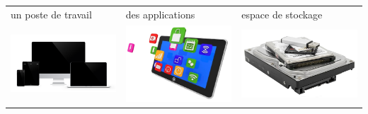 \documentclass[xcolor=table]{beamer}
\begin{document}
\begin{frame}
\begin{center}
	\begin{tabular}{p{}p{}p{}}
	un poste de travail & des applications & espace de stockage \\
	\includegraphics[height=.25\textheight]{..//img/Bweb01-environnement/poste-travail.png}&
	\includegraphics[height=.25\textheight]{..//img/Bweb01-environnement/applications.jpg}&
	\includegraphics[height=.25\textheight]{..//img/Bweb01-environnement/stockage.jpg}\\
	

\end{tabular}
\end{center}
\end{frame}
\end{document}
